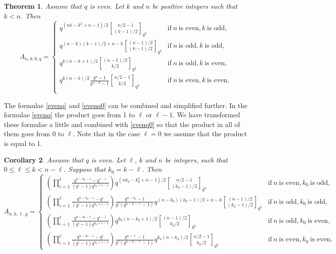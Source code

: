 \documentclass[a4paper,11pt]{article}
\newtheorem{theorem}{Theorem}
\newtheorem{corollary}[theorem]{Corollary}
\begin{document}
\begin{theorem}
Assume that $q$ is even. Let $k$ and $n$ be positive integers such that $k< n$. Then
\begin{equation}\label{evenq0}
A_{n,k,0,q}=\left\{\begin{array}{ll}
q^{(nk-k^2+n-1)/2}{n/2-1\brack(k-1)/2 }_{q^2}&\mbox{if} \ n \ \mbox{is even}, k \ \mbox{is odd},\\
q^{(n-k)(k-1)/2+n-k}{(n-1)/2\brack(k-1)/2 }_{q^2}&\mbox{if} \ n \ \mbox{is odd}, k \ \mbox{is odd},\\
q^{k(n-k+1)/2}{(n-1)/2\brack k/2 }_{q^2}&\mbox{if} \ n \ \mbox{is odd}, k \ \mbox{is even},\\
q^{k(n-k)/2}\frac{q^{n}-1}{q^{n-k}-1}{n/2-1\brack k/2 }_{q^2}&\mbox{if} \ n \ \mbox{is even}, k \ \mbox{is even},\\
\end{array}\right.
\end{equation}
\end{theorem}

The formulae \eqref{evenq} and \eqref{evenq0} can be combined and simplified further. In the formulae \eqref{evenq} the product goes from 1 to $\ell$ or $\ell-1$. We have transformed these formulae a little and combined with \eqref{evenq0} so that the product in all of them goes from 0 to $\ell$. Note that in the case $\ell=0$ we assume that the product is equal to 1.

\begin{corollary}\label{cor-evenq}
Assume that $q$ is even. Let $\ell$, $k$ and $n$ be integers, such that $0\le\ell\le k< n-\ell$. Suppose that $k_0=k-\ell$. Then
\[
A_{n,k,\ell,q}=\left\{\begin{array}{ll}
\left(\prod_{i=1}^\ell\frac{q^{n-k_0-i}-q^{i-1}}{(q^i-1)q^{k_0+i-1}}\right)q^{(nk_0-k_0^2+n-1)/2}{n/2-1\brack(k_0-1)/2 }_{q^2}&\mbox{if} \ n \ \mbox{is even}, k_0 \ \mbox{is odd},\\
\left(\prod_{i=1}^{\ell}\frac{q^{n-k_0-i}-q^{i}}{(q^i-1)q^{k_0+i-1}}\right)\frac{q^{n-k_0}-1}{q^\ell(q^{n-k-\ell}-1)}q^{(n-k_0)(k_0-1)/2+n-k}{(n-1)/2\brack(k_0-1)/2 }_{q^2}&\mbox{if} \ n \ \mbox{is odd}, k_0 \ \mbox{is odd},\\
\left(\prod_{i=1}^\ell\frac{q^{n-k_0-i}-q^{i-1}}{(q^i-1)q^{k_0+i-1}}\right)q^{k_0(n-k_0+1)/2}{(n-1)/2\brack k_0/2 }_{q^2}&\mbox{if} \ n \ \mbox{is odd}, k_0 \ \mbox{is even},\\
\left(\prod_{i=1}^{\ell}\frac{q^{n-k_0-i}-q^{i}}{(q^i-1)q^{k_0+i-1}}\right)\frac{q^{n-\ell}-1}{q^{\ell}(q^{n-k-\ell}-1)}q^{k_0(n-k_0)/2}{n/2-1\brack k_0/2 }_{q^2}&\mbox{if} \ n \ \mbox{is even}, k_0 \ \mbox{is even}.
\end{array}\right.
\]
\end{corollary}
\end{document}

